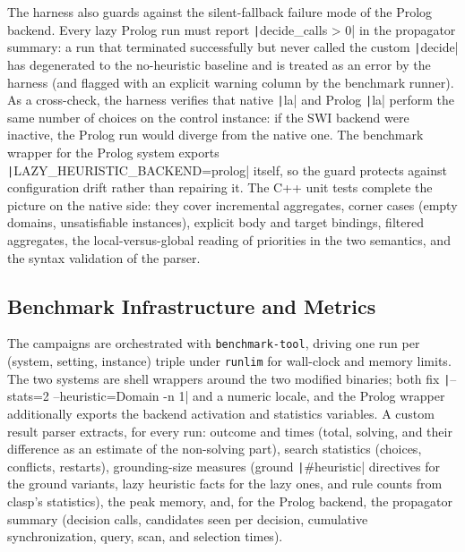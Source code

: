 The harness also guards against the silent-fallback failure mode of the Prolog backend. Every lazy Prolog run must report \texttt|decide_calls > 0| in the propagator summary: a run that terminated successfully but never called the custom \texttt|decide| has degenerated to the no-heuristic baseline and is treated as an error by the harness (and flagged with an explicit warning column by the benchmark runner). As a cross-check, the harness verifies that native \texttt|la| and Prolog \texttt|la| perform the same number of choices on the control instance: if the SWI backend were inactive, the Prolog run would diverge from the native one. The benchmark wrapper for the Prolog system exports \texttt|LAZY_HEURISTIC_BACKEND=prolog| itself, so the guard protects against configuration drift rather than repairing it. The C++ unit tests complete the picture on the native side: they cover incremental aggregates, corner cases (empty domains, unsatisfiable instances), explicit body and target bindings, filtered aggregates, the local-versus-global reading of priorities in the two semantics, and the syntax validation of the parser.

\subsection{Benchmark Infrastructure and Metrics}

The campaigns are orchestrated with \texttt{benchmark-tool}, driving one run per (system, setting, instance) triple under \texttt{runlim} \cite{runlim} for wall-clock and memory limits. The two systems are shell wrappers around the two modified binaries; both fix \texttt|--stats=2 --heuristic=Domain -n 1| and a numeric locale, and the Prolog wrapper additionally exports the backend activation and statistics variables. A custom result parser extracts, for every run: outcome and times (total, solving, and their difference as an estimate of the non-solving part), search statistics (choices, conflicts, restarts), grounding-size measures (ground \texttt|#heuristic| directives for the ground variants, lazy heuristic facts for the lazy ones, and rule counts from clasp's statistics), the peak memory, and, for the Prolog backend, the propagator summary (decision calls, candidates seen per decision, cumulative synchronization, query, scan, and selection times).

